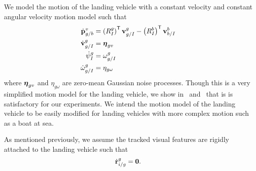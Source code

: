 We model the motion of the landing vehicle
with a constant velocity and constant
angular velocity motion model such that
\begin{align}
  \dot{\boldsymbol{\mathrm{p}}}_{g/b}^{v} &= \left( R_{I}^{g} \right)^{\mathsf{T}}
  \boldsymbol{\mathrm{v}}_{g/I}^{g} - \left( R_{I}^{b} \right)^{\mathsf{T}}
  \boldsymbol{\mathrm{v}}_{b/I}^{b} \label{eq:goal_dynamics} \\
  \dot{\boldsymbol{\mathrm{v}}}_{g/I}^{g} &= \boldsymbol{\mathrm{\eta}}_{gv} \nonumber \\
  \dot{\psi}_{I}^{g} &= \omega_{g/I}^g \nonumber \\
  \dot{\omega}_{g/I}^{g} &= \eta_{g\omega} \nonumber
\end{align}
where $\boldsymbol{\mathrm{\eta}}_{gv}$ and $\eta_{g\omega}$ are zero-mean Gaussian noise
processes. Though this is a very simplified motion model for the landing
vehicle, we show in~ and~ that is is
satisfactory for our experiments. We intend the motion model of the landing
vehicle to be easily modified for landing vehicles with more complex motion such
as a boat at sea.

As mentioned previously, we assume the tracked visual features are rigidly
attached to the landing vehicle such that
\begin{equation}
  \dot{\boldsymbol{\mathrm{r}}}_{i/g}^g = \boldsymbol{\mathrm{0}}. \label{eq:feature_dynamics}
\end{equation}

